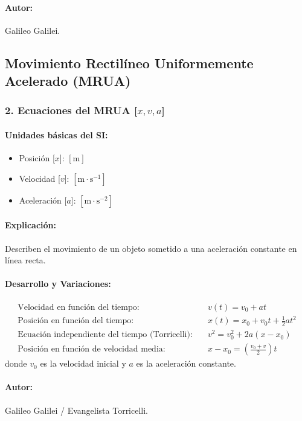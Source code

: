 \documentclass[12pt,a4paper]{article}
\begin{document}
\paragraph*{Autor:} Galileo Galilei.

\subsection{Movimiento Rectilíneo Uniformemente Acelerado (MRUA)}

\subsubsection*{2. Ecuaciones del MRUA [$x, v, a$]}
\paragraph*{Unidades básicas del SI:}
\begin{itemize}
    \item Posición [$x$]: $[\text{m}]$
    \item Velocidad [$v$]: $[\text{m}\cdot\text{s}^{-1}]$
    \item Aceleración [$a$]: $[\text{m}\cdot\text{s}^{-2}]$
\end{itemize}
\paragraph*{Explicación:} Describen el movimiento de un objeto sometido a una aceleración constante en línea recta.
\paragraph*{Desarrollo y Variaciones:}
\begin{align*}
\text{Velocidad en función del tiempo:} \quad & v(t) = v_0 + a t \\
\text{Posición en función del tiempo:} \quad & x(t) = x_0 + v_0 t + \frac{1}{2} a t^2 \\
\text{Ecuación independiente del tiempo (Torricelli):} \quad & v^2 = v_0^2 + 2 a (x - x_0) \\
\text{Posición en función de velocidad media:} \quad & x - x_0 = \left( \frac{v_0 + v}{2} \right) t
\end{align*}
donde $v_0$ es la velocidad inicial y $a$ es la aceleración constante.
\paragraph*{Autor:} Galileo Galilei / Evangelista Torricelli.
\end{document}
